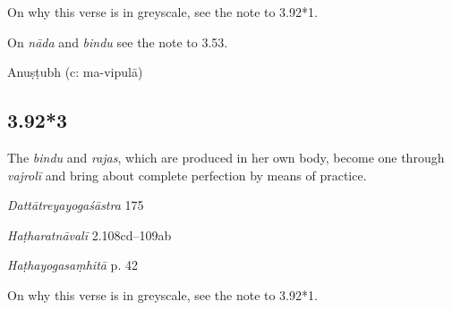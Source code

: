 \begin{ekdosis}
\begin{philcomm}[hp03_092_2]
On why this verse is in greyscale, see the note to 3.92*1.

On \emph{nāda} and \emph{bindu} see the note to 3.53. 
%
\end{philcomm}

\begin{metre}[hp03_092_2]
Anuṣṭubh (c: ma-vipulā)
\end{metre}

\subsection*{3.92*3}
\begin{translation}[hp03_092_3]
The \emph{bindu} and \emph{rajas}, which are produced in her own body, become one through \emph{vajrolī} and bring about complete perfection by means of practice.%
\end{translation}

\begin{sources}[hp03_092_3]
\emph{Dattātreyayogaśāstra} 175
\begin{versinnote}
\end{versinnote}
\end{sources}

\begin{testimonia}[hp03_092_3]
\emph{Haṭharatnāvalī} 2.108cd--109ab
\begin{versinnote}
\end{versinnote}

\emph{Haṭhayogasaṃhitā} p. 42
\begin{versinnote}
\end{versinnote}
\end{testimonia}

\begin{philcomm}[hp03_092_3]
On why this verse is in greyscale, see the note to 3.92*1.
\end{philcomm}


\end{ekdosis}
